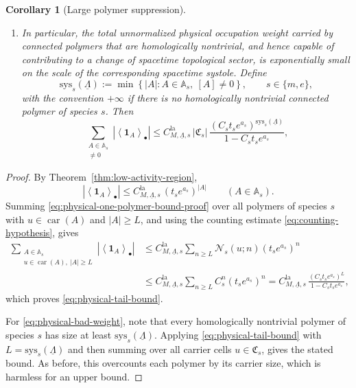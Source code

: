\documentclass[dvipsnames,a4paper]{article}
\numberwithin{equation}{section}
\newtheorem{corollary}[theorem]{Corollary}
\theoremstyle{definition}
\theoremstyle{remark}
\begin{document}
\begin{corollary}[Large polymer suppression]
\begin{enumerate}[label=(\roman*)]
		\item\label{corItem:homological-tail}
		In particular, the total unnormalized physical occupation weight carried by connected
		polymers that are homologically nontrivial, and hence capable of contributing to a
		change of spacetime topological sector, is exponentially small on the scale of the
		corresponding spacetime systole. Define
		\begin{equation}
			\mathrm{sys}_s(\underline\Lambda)
			:=
			\min\left\{
			|A|:
			A\in\mathbb A_s,\ [A]\neq 0
			\right\},
			\qquad s\in\{m,e\},
			\label{eq:systole}
		\end{equation}
		with the convention \(+\infty\) if there is no homologically nontrivial connected
		polymer of species \(s\). Then
		\begin{equation}
			\sum_{\substack{A\in\mathbb A_s\\ [A]\neq 0}} \left|\left\langle \mathbf 1_A \right\rangle_\bullet\right|
			\le
			C_{M,\underline\Lambda,s}^{\mathrm{la}}\,
			|\mathfrak C_s|\,
			\frac{(C_s t_s e^{a_s})^{\mathrm{sys}_s(\underline\Lambda)}}
			{1-C_s t_s e^{a_s}},
			\label{eq:physical-bad-weight}
		\end{equation}
	\end{enumerate}
\end{corollary}

\begin{proof}
	By Theorem~\ref{thm:low-activity-region},
	\begin{equation}
		\left|
		\left\langle \mathbf 1_A \right\rangle_\bullet
		\right|
		\le
		C_{M,\underline\Lambda,s}^{\mathrm{la}}\,(t_s e^{a_s})^{|A|}
		\qquad
		(A\in\mathbb A_s).
		\label{eq:physical-one-polymer-bound-proof}
	\end{equation}
	Summing \eqref{eq:physical-one-polymer-bound-proof} over all polymers of species \(s\)
	with \(u\in\operatorname{car}(A)\) and \(|A|\ge L\), and using the counting estimate
	\eqref{eq:counting-hypothesis}, gives
	\begin{align}
		\sum_{\substack{A\in\mathbb A_s\\
				u\in\operatorname{car}(A),\ |A|\ge L}}
		\left|
		\left\langle \mathbf 1_A \right\rangle_\bullet
		\right|
		&\le
		C_{M,\underline\Lambda,s}^{\mathrm{la}}
		\sum_{n\ge L}
		\mathcal N_s(u;n)(t_s e^{a_s})^n
		\nonumber\\
		&\le
		C_{M,\underline\Lambda,s}^{\mathrm{la}}
		\sum_{n\ge L}
		C_s^n(t_s e^{a_s})^n
		=
		C_{M,\underline\Lambda,s}^{\mathrm{la}}\,
		\frac{(C_s t_s e^{a_s})^L}{1-C_s t_s e^{a_s}},
	\end{align}
	which proves \eqref{eq:physical-tail-bound}.
	
	For \eqref{eq:physical-bad-weight}, note that every homologically nontrivial polymer of
	species \(s\) has size at least \(\mathrm{sys}_s(\underline\Lambda)\). Applying
	\eqref{eq:physical-tail-bound} with \(L=\mathrm{sys}_s(\underline\Lambda)\) and then summing
	over all carrier cells \(u\in\mathfrak C_s\), gives the stated bound. As before, this
	overcounts each polymer by its carrier size, which is harmless for an upper bound.
\end{proof}
\end{document}
